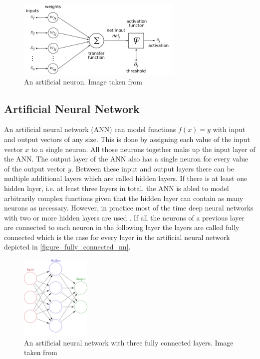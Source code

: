 \begin{figure}[H]
    \centering
    \includegraphics[width=0.7\textwidth]{images/figures/artificial_neuronHOML.png}
    \caption{An artificial neuron. Image taken from \parencite{2005-chrislb-artificial-neuron}}
\end{figure}


\subsection{Artificial Neural Network}

An artificial neural network (ANN) can model functions $f(x) = y$ with input and output vectors of any size.
This is done by assigning each value of the input vector $x$ to a single neuron. All those neurons together make
up the input layer of the ANN. The output layer of the ANN also has a single neuron for every value of the
output vector $y$. Between these input and output layers there can be multiple additional layers which are called
hidden layers. If there is at least one hidden layer, i.e. at least three layers in total, the ANN is abled to 
model arbitrarily complex functions given that the hidden layer can contain as many neurons as necessary.
However, in practice most of the time
deep neural networks with two or more hidden layers are used \parencite{2017-geron-homl}.
If all the neurons of a previous layer are connected to each neuron in the following layer the layers are
called fully connected which is the case for every layer in the artificial neural network depicted
in \autoref{figure_fully_connected_nn}.

\begin{figure}[ht] 
    \centering
    \includegraphics[width=0.3\textwidth]{images/figures/artificial_neural_network.png}
    \caption{An artificial neural network with three fully connected layers.
    Image taken from \parencite{2013-glosser-ann}} \label{figure_fully_connected_nn}
\end{figure} 

